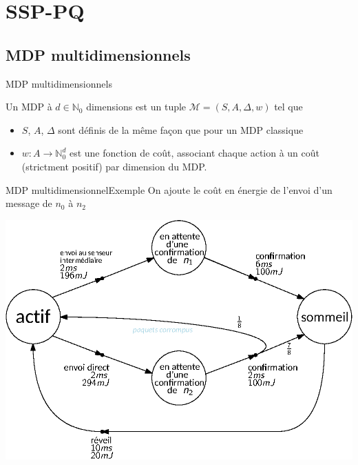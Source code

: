 \documentclass[compress]{beamer}
\begin{document}
\section{SSP-PQ}
\subsection{MDP multidimensionnels}
\begin{frame}{MDP multidimensionnels}
  \begin{definition}
    Un MDP à $d \in \mathbb{N}_0$ dimensions est un tuple $\mathcal{M} = (S, A, \Delta, w)$ tel que
    \begin{itemize}
      \item $S$, $A$, $\Delta$ sont définis de la même façon que pour un MDP classique
      \item $w : A \rightarrow \mathbb{N}_0^d$ est une fonction de coût, associant chaque action à un coût (strictment positif) par dimension du MDP.
    \end{itemize}
  \end{definition}
\end{frame}

\begin{frame}{MDP multidimensionnel}{Exemple}
    On ajoute le coût en énergie de l'envoi d'un message de $n_0$ à $n_2$
  \begin{center}
    \includegraphics[width=0.7\linewidth]{resources/mdpmdp}
  \end{center}
\end{frame}
\end{document}
